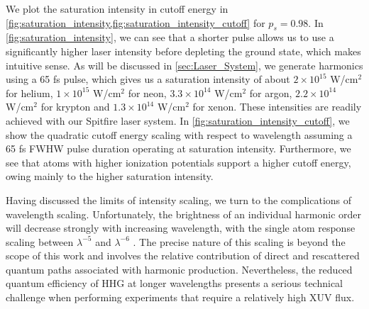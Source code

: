 We plot the saturation intensity in cutoff energy in \cref{fig:saturation_intensity,fig:saturation_intensity_cutoff} for $p_s = 0.98$. In \cref{fig:saturation_intensity}, we can see that a shorter pulse allows us to use a significantly higher laser intensity before depleting the ground state, which makes intuitive sense. As will be discussed in \cref{sec:Laser_System}, we generate harmonics using a 65 fs pulse, which gives us a saturation intensity of about $2\times10^{15}$ W/cm$^2$ for helium, $1\times10^{15}$ W/cm$^2$ for neon, $3.3\times10^{14}$ W/cm$^2$ for argon, $2.2\times10^{14}$ W/cm$^2$ for krypton and $1.3\times10^{14}$ W/cm$^2$ for xenon. These intensities are readily achieved with our Spitfire laser system. In \cref{fig:saturation_intensity_cutoff}, we show the quadratic cutoff energy scaling with respect to wavelength assuming a 65 fs FWHW pulse duration operating at saturation intensity. Furthermore, we see that atoms with higher ionization potentials support a higher cutoff energy, owing mainly to the higher saturation intensity.


Having discussed the limits of intensity scaling, we turn to the complications of wavelength scaling. Unfortunately, the brightness of an individual harmonic order will decrease strongly with increasing wavelength, with the single atom response scaling between $\lambda^{-5}$ and $\lambda^{-6}$ \cite{tateScalingWavePacketDynamics2007,shinerWavelengthScalingHigh2009,colosimoScalingStrongfieldInteractions2008}. The precise nature of this scaling is beyond the scope of this work and involves the relative contribution of direct and rescattered quantum paths associated with harmonic production. Nevertheless, the reduced quantum efficiency of HHG at longer wavelengths presents a serious technical challenge when performing experiments that require a relatively high XUV flux.

